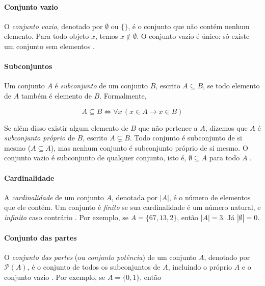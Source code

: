 \documentclass[a4paper,12pt]{article}
\begin{document}
\paragraph{Conjunto vazio}

O \textit{conjunto vazio}, denotado por $\emptyset$ ou $\{\}$, é o conjunto que não contém nenhum elemento. Para todo objeto $x$, temos $x \notin \emptyset$. O conjunto vazio é único: só 
existe um conjunto sem elementos \cite{murakami}.




\paragraph{Subconjuntos}

Um conjunto $A$ é \textit{subconjunto} de um conjunto $B$, escrito $A \subseteq B$, se todo elemento de $A$ também é elemento de $B$. Formalmente,

\[
    A \subseteq B \iff \forall x\, (x \in A \rightarrow x \in B)
\]

Se além disso existir algum elemento de $B$ que não pertence a $A$, dizemos que $A$ é \textit{subconjunto próprio} de $B$, escrito $A \subsetneq B$. Todo conjunto é subconjunto de si mesmo 
($A \subseteq A$), mas nenhum conjunto é subconjunto próprio de si mesmo. O conjunto vazio é subconjunto de qualquer conjunto, isto é, $\emptyset \subseteq A$ para todo $A$ \cite{murakami}. 



\paragraph{Cardinalidade}

A \textit{cardinalidade} de um conjunto $A$, denotada por $|A|$, é o número de elementos que ele contém. Um conjunto é \textit{finito} se sua cardinalidade é um número natural, e \textit{infinito} 
caso contrário \cite{murakami}. Por exemplo, se $A = \{67,13,2\}$, então $|A| = 3$. Já $|\emptyset| = 0$.



\paragraph{Conjunto das partes}

O \textit{conjunto das partes} (ou \textit{conjunto potência}) de um conjunto $A$, denotado por $\mathcal{P}(A)$, é o conjunto de todos os subconjuntos de $A$, incluindo o próprio $A$ e o conjunto vazio \cite{murakami}. Por exemplo, se $A = \{0,1\}$, então
\end{document}
